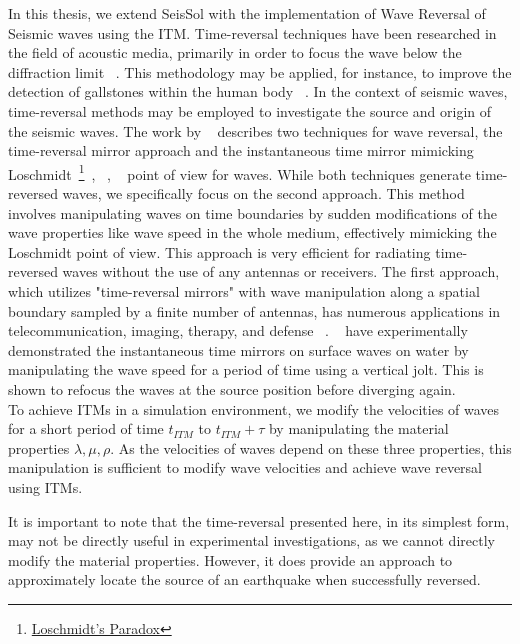 In this thesis, we extend SeisSol with the implementation of Wave Reversal of Seismic waves using the \acf{ITM}. 
Time-reversal techniques have been researched in the field of acoustic media, primarily in order to focus the wave below
the diffraction limit ~\parencite{67072}. This methodology may be applied, for instance, to improve the detection of gallstones within the human body ~\parencite{10.1063/1.881692}. 
In the context of seismic waves, time-reversal methods may be employed to investigate the source and origin of the seismic waves.
The work by ~\parencite{Fink2017} describes two techniques for wave reversal, the time-reversal mirror approach and the instantaneous time mirror 
mimicking Loschmidt~\footnote{\href{https://en.wikipedia.org/wiki/Loschmidt\%27s_paradox}{Loschmidt's Paradox}}~\parencite{wu1975}, ~\parencite{binder2023}, ~\parencite{loschmidt} point of view
 for waves. 
While both techniques generate time-reversed waves, we specifically focus on the second approach. 
This method involves manipulating waves on time boundaries by sudden modifications of the wave properties like wave speed in the whole medium, 
effectively mimicking the Loschmidt point of view. 
This approach is very efficient for radiating time-reversed waves without the use of any antennas or receivers. 
The first approach, which utilizes "time-reversal mirrors" with wave manipulation along a spatial boundary sampled by a finite number of antennas, has numerous applications in telecommunication, imaging, therapy, and defense ~\parencite{Fink2017}. 
~\parencite{Bacot2016} have experimentally demonstrated the instantaneous time mirrors on surface waves on water by manipulating the wave speed for a period of time using a vertical jolt.
This is shown to refocus the waves at the source position before diverging again.\\

To achieve \ac{ITM}s in a simulation environment, we modify the velocities of waves for a short period of time $t_{ITM}$ to $t_{ITM} + \tau$ by manipulating 
the material properties $\lambda, \mu, \rho$. As the velocities of waves depend on these three properties, this manipulation is 
sufficient to modify wave velocities and achieve wave reversal using \ac{ITM}s.

It is important to note that the time-reversal presented here, in its simplest form, may not be directly useful in experimental 
investigations, as we cannot directly modify the material properties. However, it does provide an approach to approximately 
locate the source of an earthquake when successfully reversed. \\


